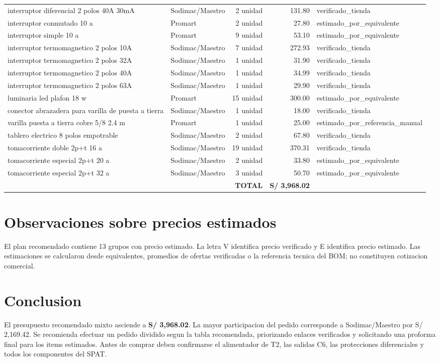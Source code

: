 \begin{landscape}
\begin{longtable}{p{8.0cm}p{3.2cm}r r p{4.0cm}}
interruptor diferencial 2 polos 40A 30mA & Sodimac/Maestro & 2 unidad & 131.80 & verificado\_tienda \\
interruptor conmutado 10 a & Promart & 2 unidad & 27.80 & estimado\_por\_equivalente \\
interruptor simple 10 a & Promart & 9 unidad & 53.10 & estimado\_por\_equivalente \\
interruptor termomagnetico 2 polos 10A & Sodimac/Maestro & 7 unidad & 272.93 & verificado\_tienda \\
interruptor termomagnetico 2 polos 32A & Sodimac/Maestro & 1 unidad & 31.90 & verificado\_tienda \\
interruptor termomagnetico 2 polos 40A & Sodimac/Maestro & 1 unidad & 34.99 & verificado\_tienda \\
interruptor termomagnetico 2 polos 63A & Sodimac/Maestro & 1 unidad & 29.90 & verificado\_tienda \\
luminaria led plafon 18 w & Promart & 15 unidad & 300.00 & estimado\_por\_equivalente \\
conector abrazadera para varilla de puesta a tierra & Sodimac/Maestro & 1 unidad & 18.00 & verificado\_tienda \\
varilla puesta a tierra cobre 5/8 2.4 m & Promart & 1 unidad & 25.00 & estimado\_por\_referencia\_manual \\
tablero electrico 8 polos empotrable & Sodimac/Maestro & 2 unidad & 67.80 & verificado\_tienda \\
tomacorriente doble 2p+t 16 a & Sodimac/Maestro & 19 unidad & 370.31 & verificado\_tienda \\
tomacorriente especial 2p+t 20 a & Sodimac/Maestro & 2 unidad & 33.80 & estimado\_por\_equivalente \\
tomacorriente especial 2p+t 32 a & Sodimac/Maestro & 3 unidad & 50.70 & estimado\_por\_equivalente \\
\midrule\multicolumn{3}{r}{\textbf{TOTAL}} & \textbf{S/ 3,968.02} & \\ \bottomrule\end{longtable}\normalsize\end{landscape}
\section{Observaciones sobre precios estimados}
El plan recomendado contiene 13 grupos con precio estimado. La letra V identifica precio verificado y E identifica precio estimado. Las estimaciones se calcularon desde equivalentes, promedios de ofertas verificadas o la referencia tecnica del BOM; no constituyen cotizacion comercial.
\section{Conclusion}
El presupuesto recomendado mixto asciende a \textbf{S/ 3,968.02}. La mayor participacion del pedido corresponde a Sodimac/Maestro por S/ 2,169.42. Se recomienda efectuar un pedido dividido segun la tabla recomendada, priorizando enlaces verificados y solicitando una proforma final para los items estimados. Antes de comprar deben confirmarse el alimentador de T2, las salidas C6, las protecciones diferenciales y todos los componentes del SPAT.
